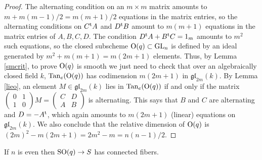 \documentclass[10pt]{article}
\newcommand{\GL}{\operatorname{GL}}
\renewcommand{\(}{\left(}
\renewcommand{\)}{\right)}
\numberwithin{thm}{subsection}
\begin{document}
\begin{proof}
The alternating condition
on an $m \times m$ matrix amounts to $m + m(m-1)/2 = m(m+1)/2$ equations in the matrix entries,
so the alternating conditions on $C^{\rm{t}}A$ and $D^{\rm{t}}B$
amount to $m(m+1)$ equations in the matrix entries of $A, B, C, D$.  The condition
$D^{\rm{t}}A + B^{\rm{t}}C = 1_m$ amounts to $m^2$ such equations,
so the closed subscheme ${\rm{O}}(q) \subset \GL_n$
is defined by an ideal generated by
$m^2 + m(m+1) = m(2m+1)$ elements.  
Thus, by Lemma \ref{smcrit}, to prove ${\rm{O}}(q)$ is smooth we just need to check that
over an algebraically closed field $k$, ${\rm{Tan}}_e({\rm{O}}(q))$ has
codimension $m(2m+1)$ in $\mathfrak{gl}_{2m}(k)$.
By Lemma \ref{lieo}, an
element $M \in \mathfrak{gl}_{2m}(k)$ lies in
${\rm{Tan}}_e({\rm{O}}(q))$ if and only if the matrix
$(\begin{smallmatrix} 0 & 1 \\ 1 & 0 \end{smallmatrix}) M = 
(\begin{smallmatrix} C & D \\ A & B \end{smallmatrix})$ is alternating.
This says that $B$ and $C$ are alternating and $D = -A^{\rm{t}}$,
which again amounts to $m(2m+1)$ (linear) equations on
$\mathfrak{gl}_{2m}(k)$.  We also
conclude that the relative dimension of ${\rm{O}}(q)$
is $(2m)^2 - m(2m+1) = 2m^2 - m = n(n-1)/2$.
\end{proof}


\begin{cor}\label{conneven}
If $n$ is even then ${\rm{SO}}(q) \rightarrow S$ has connected fibers.
\end{cor}
\end{document}
